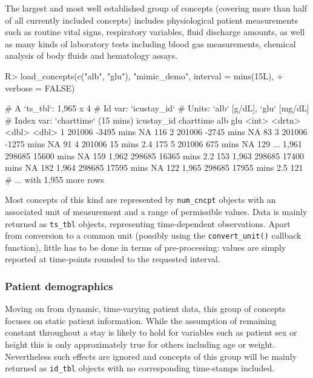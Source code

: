 \documentclass[
  notitle]{jss}
\begin{document}
The largest and most well established group of concepts (covering more
than half of all currently included concepts) includes physiological
patient measurements such as routine vital signs, respiratory variables,
fluid discharge amounts, as well as many kinds of laboratory tests
including blood gas measurements, chemical analysis of body fluids and
hematology assays.

\begin{CodeChunk}
\begin{CodeInput}
R> load_concepts(c("alb", "glu"), "mimic_demo", interval = mins(15L),
+               verbose = FALSE)
\end{CodeInput}
\begin{CodeOutput}
# A `ts_tbl`: 1,965 x 4
# Id var:     `icustay_id`
# Units:      `alb` [g/dL], `glu` [mg/dL]
# Index var:  `charttime` (15 mins)
      icustay_id charttime    alb   glu
           <int> <drtn>     <dbl> <dbl>
    1     201006 -3495 mins  NA     116
    2     201006 -2745 mins  NA      83
    3     201006 -1275 mins  NA      91
    4     201006    15 mins   2.4   175
    5     201006   675 mins  NA     129
  ...
1,961     298685 15600 mins  NA     159
1,962     298685 16365 mins   2.2   153
1,963     298685 17400 mins  NA     182
1,964     298685 17595 mins  NA     122
1,965     298685 17955 mins   2.5   121
# ... with 1,955 more rows
\end{CodeOutput}
\end{CodeChunk}

Most concepts of this kind are represented by \texttt{num\_cncpt}
objects with an associated unit of measurement and a range of
permissible values. Data is mainly returned as \texttt{ts\_tbl} objects,
representing time-dependent observations. Apart from conversion to a
common unit (possibly using the \texttt{convert\_unit()} callback
function), little has to be done in terms of pre-processing: values are
simply reported at time-points rounded to the requested interval.

\hypertarget{patient-demographics}{%
\subsubsection{Patient demographics}\label{patient-demographics}}

Moving on from dynamic, time-varying patient data, this group of
concepts focuses on static patient information. While the assumption of
remaining constant throughout a stay is likely to hold for variables
such as patient sex or height this is only approximately true for others
including age or weight. Nevertheless such effects are ignored and
concepts of this group will be mainly returned as \texttt{id\_tbl}
objects with no corresponding time-stamps included.
\end{document}
